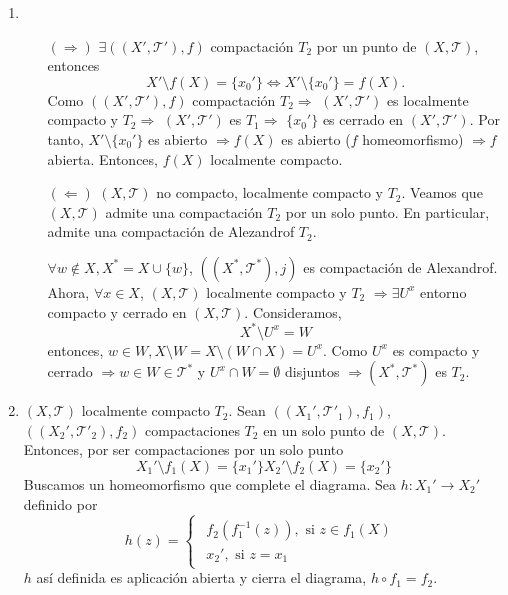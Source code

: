 \begin{dem}
  \begin{enumerate}[label=(\roman*)]
    \item 
      \begin{enumerate}[label=(\roman*)]
        \item []
        \item [$(\Rightarrow)$] $\exists ( ( X', \mathcal{T}' ), f )$ compactación $T_{2}$ por un punto de $( X, \mathcal{T} )$, entonces
          \[
            X' \setminus f(X) = \{ x_{0}' \} \Leftrightarrow X' \setminus \{ x_{0}' \} = f(X).
          \]
          Como $( ( X', \mathcal{T}' ), f )$ compactación $T_{2} \Rightarrow $ $( X', \mathcal{T}' )$ es localmente compacto y $T_{2} \Rightarrow$ $( X', \mathcal{T}' )$ es $T_{1} \Rightarrow$ $\{ x_{0}' \}$ es cerrado en $( X', \mathcal{T}' )$. Por tanto, $X' \setminus \{ x_{0}' \}$ es abierto $\Rightarrow f(X)$ es abierto ($f$ homeomorfismo) $\Rightarrow f$ abierta. Entonces, $f(X)$ localmente compacto.
        \item [$(\Leftarrow)$] $( X, \mathcal{T} )$ no compacto, localmente compacto y $T_{2}$. Veamos que $( X, \mathcal{T} )$ admite una compactación $T_{2}$ por un solo punto. En particular, admite una compactación de Alezandrof $T_{2}$.

          $\forall w \not \in X, X^* = X \cup \{ w \}$, $( ( X^*, \mathcal{T}^* ), j )$ es compactación de Alexandrof. Ahora, $\forall x \in X$, $( X, \mathcal{T} )$ localmente compacto y $T_{2}$ $\Rightarrow \exists U^{x}$ entorno compacto y cerrado  en $( X, \mathcal{T} )$. Consideramos, 
          \[ 
            X^* \setminus U^{x} = W 
          \] 
          entonces, $w \in W, X \setminus W = X \setminus ( W \cap X) = U^{x}$. Como $U^{x}$ es compacto y cerrado $\Rightarrow w \in W \in \mathcal{T}^*$ y $U^{x} \cap W = \emptyset$ disjuntos $\Rightarrow ( X^*, \mathcal{T}^* )$ es $T_{2}$.
      \end{enumerate}
    \item $( X, \mathcal{T} )$ localmente compacto $T_{2}$. Sean $( ( X_{1}', \mathcal{T}'_{1} ), f_{1} )$, $( ( X_{2}', \mathcal{T}'_{2} ), f_{2} )$ compactaciones $T_{2}$ en un solo punto de $( X, \mathcal{T} )$. Entonces, por ser compactaciones por un solo punto
      \[ 
        X_{1}' \setminus f_{1}(X) = \{  x_{1}' \}
        X_{2}' \setminus f_{2}(X) = \{  x_{2}' \}
      \] 
      Buscamos un homeomorfismo que complete el diagrama. Sea $h : X_{1}' \to X_{2}'$ definido por
      \[ 
        h(z) =
        \begin{cases}
          \begin{aligned}
            f_{2}(f_{1}^{-1}(z)), \text{ si } z \in f_{1}(X)\\
            x_{2}', \text{ si } z = x_{1}
          \end{aligned}
        \end{cases} 
      \] 
      $h$ así definida es aplicación abierta y cierra el diagrama, $h \circ f_{1} = f_{2}$.


\end{enumerate}
\end{dem}
